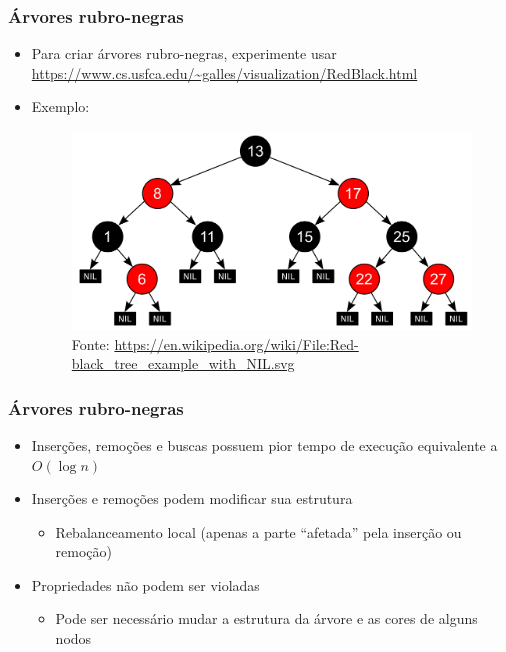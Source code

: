 \documentclass[aspectratio=169]{beamer}
\begin{document}
\begin{frame}\frametitle{Árvores rubro-negras}
\begin{itemize}
	\item Para criar árvores rubro-negras, experimente usar\\
\small{\url{https://www.cs.usfca.edu/~galles/visualization/RedBlack.html}}
	\item Exemplo:
\begin{figure}[h]
	\centering
	\includegraphics[height=0.5\paperheight]{imagens/arvore_rubro_negra.png}\\
\tiny{Fonte: \url{https://en.wikipedia.org/wiki/File:Red-black_tree_example_with_NIL.svg}}
\end{figure}
\end{itemize}
\end{frame}

\begin{frame}\frametitle{Árvores rubro-negras}
\begin{itemize}
	\item Inserções, remoções e buscas possuem pior tempo de execução equivalente a $O(\log{n})$
	\item Inserções e remoções podem modificar sua estrutura
	\begin{itemize}
		\item Rebalanceamento local (apenas a parte ``afetada'' pela inserção ou remoção)
	\end{itemize}
	\item Propriedades não podem ser violadas
	\begin{itemize}
		\item Pode ser necessário mudar a estrutura da árvore e as cores de alguns nodos
	\end{itemize}
\end{itemize}
\end{frame}
\end{document}

